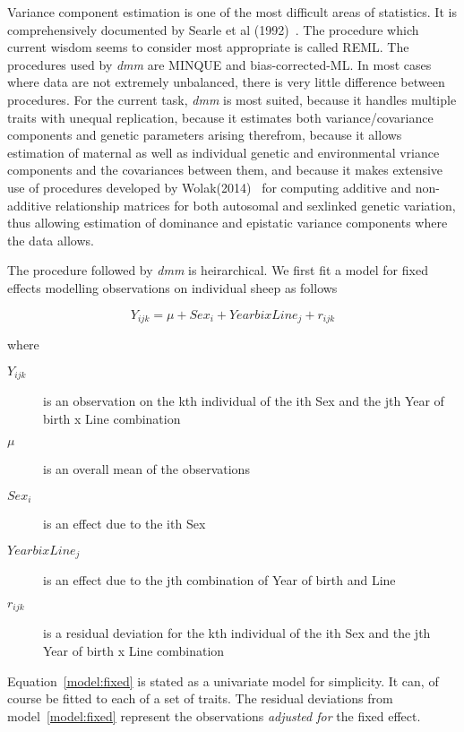 \documentclass[titlepage]{article}  %
\begin{document}
Variance component estimation is one of the most difficult areas of statistics. It is comprehensively documented by Searle et al (1992)~\cite{sear:92}. The procedure which current wisdom seems to consider most appropriate is called REML. The procedures used by {\em dmm} are MINQUE and bias-corrected-ML. In most cases where data are not extremely unbalanced, there is very little difference between procedures.  For the current task, {\em dmm} is most suited, because it handles multiple traits with unequal replication, because it estimates both variance/covariance components and genetic parameters arising therefrom, because it allows estimation of maternal as well as individual genetic and environmental vriance components and the covariances between them, and because it makes extensive use of procedures developed by Wolak(2014)~\cite{wola:14} for computing additive and non-additive relationship matrices  for both autosomal and sexlinked genetic variation, thus allowing estimation of dominance and epistatic variance components where the data allows.

The procedure followed by {\em dmm} is heirarchical. We first fit a model for fixed effects modelling observations on individual sheep as follows

\begin{equation}
\label{model:fixed}
Y_{ijk} = \mu + Sex_{i} + YearbixLine_{j} + r_{ijk}
\end{equation}

where
\begin{description}
\item[$Y_{ijk}$] is an observation on the kth individual of the ith Sex and the jth Year of birth x Line combination
\item[$\mu$] is an overall mean of the observations
\item[$Sex_{i}$] is an effect due to the ith Sex
\item[$YearbixLine_{j}$] is an effect due to the jth combination of Year of birth and Line
\item[$r_{ijk}$] is a residual deviation for the kth individual of the ith Sex and the jth Year of birth x Line combination
\end{description}

Equation~\ref{model:fixed} is stated as a univariate model for simplicity. It can, of course be fitted to each of a set of traits. The residual deviations from model~\ref{model:fixed} represent the observations {\em adjusted for} the fixed effect.
\end{document}
